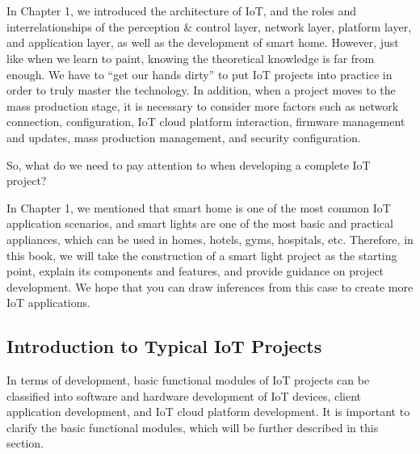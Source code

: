 \documentclass[a4paper,12pt]{book}
\begin{document}

\chapter[Introduction and Practice of IoT Projects]{}

\vspace{24pt}
In Chapter 1, we introduced the architecture of IoT, and the roles and interrelationships of the perception \& control layer, network layer, platform layer, and application layer, as well as the development of smart home. However, just like when we learn to paint, knowing the theoretical knowledge is far from enough. We have to “get our hands dirty” to put IoT projects into practice in order to truly master the technology. In addition, when a project moves to the mass production stage, it is necessary to consider more factors such as network connection, configuration, IoT cloud platform interaction, firmware management and updates, mass production management, and security configuration.

So, what do we need to pay attention to when developing a complete IoT project?

In Chapter 1, we mentioned that smart home is one of the most common IoT application scenarios, and smart lights are one of the most basic and practical appliances, which can be used in homes, hotels, gyms, hospitals, etc. Therefore, in this book, we will take the construction of a smart light project as the starting point, explain its components and features, and provide guidance on project development. We hope that you can draw inferences from this case to create more IoT applications.

\section{Introduction to Typical IoT Projects}
In terms of development, basic functional modules of IoT projects can be classified into software and hardware development of IoT devices, client application development, and IoT cloud platform development. It is important to clarify the basic functional modules, which will be further described in this section.
\end{document}
